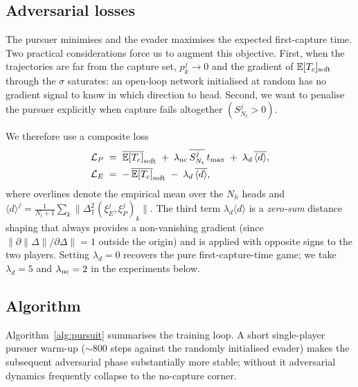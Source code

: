 \documentclass[11pt]{article}
\newcommand{\TT}{\mathbb{T}^{2}}
\newcommand{\E}{\mathbb{E}}
\begin{document}
\subsection{Adversarial losses}
The pursuer minimises and the evader maximises the expected
first-capture time.  Two practical considerations force us to augment
this objective.  First, when the trajectories are far from the capture
set, $p^j_k\to 0$ and the gradient of $\E[T_c]_{\rm soft}$ through the
$\sigma$ saturates: an open-loop network initialised at random has no
gradient signal to know in which direction to head.  Second, we want
to penalise the pursuer explicitly when capture fails altogether
$(S^j_{N_t}\!>\!0)$.

We therefore use a composite loss
\begin{align}
\label{eq:LP}
\mathcal{L}_P &\;=\; \overline{\E[T_c]}_{\rm soft}
 \;+\; \lambda_{\rm nc}\,\overline{S^j_{N_t}}\,t_{\max}
 \;+\; \lambda_d\,\overline{\langle d \rangle}, \\
\label{eq:LE}
\mathcal{L}_E &\;=\;
 -\,\overline{\E[T_c]}_{\rm soft}
 \;-\; \lambda_d\,\overline{\langle d \rangle},
\end{align}
where overlines denote the empirical mean over the $N_h$ heads and
$\langle d \rangle^j = \tfrac{1}{N_t+1}\sum_k \|\Delta_\TT(\xi^j_E,\xi^j_P)_k\|$.
The third term $\lambda_d\langle d\rangle$ is a \emph{zero-sum} distance
shaping that always provides a non-vanishing gradient (since
$\|\partial \|\Delta\|/\partial \Delta\| = 1$ outside the origin) and is
applied with opposite signs to the two players.  Setting
$\lambda_d=0$ recovers the pure first-capture-time game; we take
$\lambda_d=5$ and $\lambda_{\rm nc}=2$ in the experiments below.

\subsection{Algorithm}
Algorithm~\ref{alg:pursuit} summarises the training loop.  A short
single-player pursuer warm-up
($\sim 800$ steps against the randomly initialised evader) makes the
subsequent adversarial phase substantially more stable; without it
adversarial dynamics frequently collapse to the no-capture corner.
\end{document}
